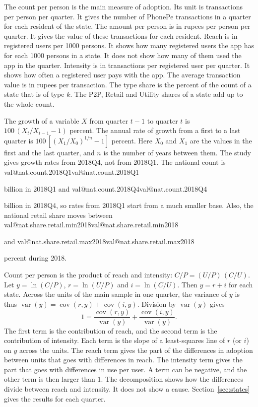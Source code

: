 \documentclass[11pt,a4paper]{article}
\makeatletter
\newcommand{\val}[1]{\ifcsname val@#1\endcsname\csname val@#1\endcsname\else
  \PackageError{study}{Unknown value key `#1'}{Run Rscript src/R/part1_study.R}\fi}
\makeatother
\begin{document}
The count per person is the main measure of adoption. Its unit is transactions per person per quarter. It gives the number of PhonePe transactions in a quarter for each resident of the state. The amount per person is in rupees per person per quarter. It gives the value of these transactions for each resident. Reach is in registered users per 1000 persons. It shows how many registered users the app has for each 1000 persons in a state. It does not show how many of them used the app in the quarter. Intensity is in transactions per registered user per quarter. It shows how often a registered user pays with the app. The average transaction value is in rupees per transaction. The type share is the percent of the count of a state that is of type $k$. The P2P, Retail and Utility shares of a state add up to the whole count.

The growth of a variable $X$ from quarter $t-1$ to quarter $t$ is $100\,(X_t/X_{t-1} - 1)$ percent. The annual rate of growth from a first to a last quarter is $100\,[(X_1/X_0)^{1/n} - 1]$ percent. Here $X_0$ and $X_1$ are the values in the first and the last quarter, and $n$ is the number of years between them. The study gives growth rates from 2018Q4, not from 2018Q1. The national count is \val{nat.count.2018Q1} billion in 2018Q1 and \val{nat.count.2018Q4} billion in 2018Q4, so rates from 2018Q1 start from a much smaller base. Also, the national retail share moves between \val{nat.share.retail.min2018} and \val{nat.share.retail.max2018} percent during 2018.

Count per person is the product of reach and intensity: $C/P = (U/P)\,(C/U)$. Let $y = \ln(C/P)$, $r = \ln(U/P)$ and $i = \ln(C/U)$. Then $y = r + i$ for each state. Across the units of the main sample in one quarter, the variance of $y$ is thus $\operatorname{var}(y) = \operatorname{cov}(r, y) + \operatorname{cov}(i, y)$. Division by $\operatorname{var}(y)$ gives
\begin{equation}
1 = \frac{\operatorname{cov}(r, y)}{\operatorname{var}(y)} + \frac{\operatorname{cov}(i, y)}{\operatorname{var}(y)}.
\end{equation}
The first term is the contribution of reach, and the second term is the contribution of intensity. Each term is the slope of a least-squares line of $r$ (or $i$) on $y$ across the units. The reach term gives the part of the differences in adoption between units that goes with differences in reach. The intensity term gives the part that goes with differences in use per user. A term can be negative, and the other term is then larger than $1$. The decomposition shows how the differences divide between reach and intensity. It does not show a cause. Section~\ref{sec:states} gives the results for each quarter.
\end{document}
